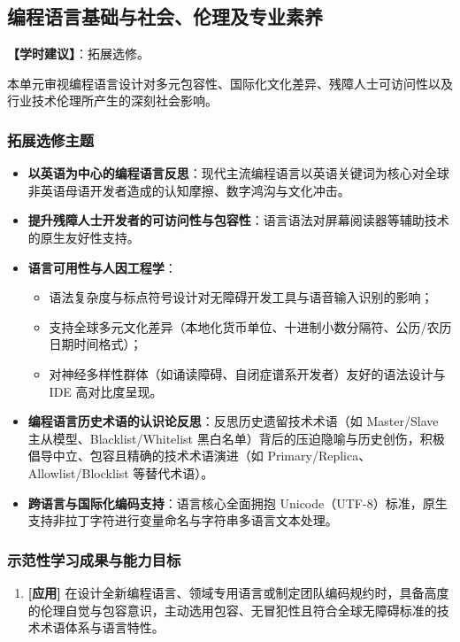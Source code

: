 \subsection{编程语言基础与社会、伦理及专业素养}
\textbf{【学时建议】}：拓展选修。

本单元审视编程语言设计对多元包容性、国际化文化差异、残障人士可访问性以及行业技术伦理所产生的深刻社会影响。

\subsubsection{拓展选修主题}
\begin{itemize}
    \item \textbf{以英语为中心的编程语言反思}：现代主流编程语言以英语关键词为核心对全球非英语母语开发者造成的认知摩擦、数字鸿沟与文化冲击。
    \item \textbf{提升残障人士开发者的可访问性与包容性}：语言语法对屏幕阅读器等辅助技术的原生友好性支持。
    \item \textbf{语言可用性与人因工程学}：
    \begin{itemize}
        \item 语法复杂度与标点符号设计对无障碍开发工具与语音输入识别的影响；
        \item 支持全球多元文化差异（本地化货币单位、十进制小数分隔符、公历/农历日期时间格式）；
        \item 对神经多样性群体（如诵读障碍、自闭症谱系开发者）友好的语法设计与 IDE 高对比度呈现。
    \end{itemize}
    \item \textbf{编程语言历史术语的认识论反思}：反思历史遗留技术术语（如 Master/\allowbreak Slave 主从模型、Blacklist/\allowbreak Whitelist 黑白名单）背后的压迫隐喻与历史创伤，积极倡导中立、包容且精确的技术术语演进（如 Primary/\allowbreak Replica、Allowlist/\allowbreak Blocklist 等替代术语）。
    \item \textbf{跨语言与国际化编码支持}：语言核心全面拥抱 Unicode（UTF-8）标准，原生支持非拉丁字符进行变量命名与字符串多语言文本处理。
\end{itemize}

\subsubsection{示范性学习成果与能力目标}
\begin{enumerate}
    \item \textbf{[应用]} 在设计全新编程语言、领域专用语言或制定团队编码规约时，具备高度的伦理自觉与包容意识，主动选用包容、无冒犯性且符合全球无障碍标准的技术术语体系与语言特性。
\end{enumerate}

